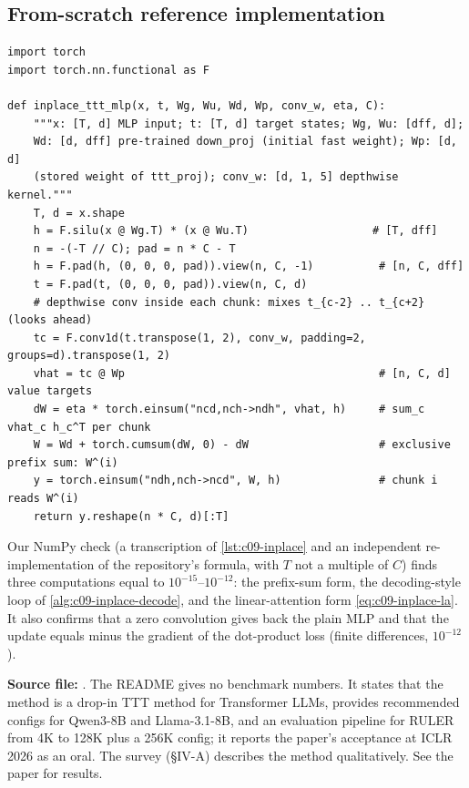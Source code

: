 \subsection{From-scratch reference implementation}

\begin{lstlisting}[caption={Reference implementation (ours): In-Place TTT MLP, parallel form.},label={lst:c09-inplace}]
import torch
import torch.nn.functional as F

def inplace_ttt_mlp(x, t, Wg, Wu, Wd, Wp, conv_w, eta, C):
    """x: [T, d] MLP input; t: [T, d] target states; Wg, Wu: [dff, d];
    Wd: [d, dff] pre-trained down_proj (initial fast weight); Wp: [d, d]
    (stored weight of ttt_proj); conv_w: [d, 1, 5] depthwise kernel."""
    T, d = x.shape
    h = F.silu(x @ Wg.T) * (x @ Wu.T)                   # [T, dff]
    n = -(-T // C); pad = n * C - T
    h = F.pad(h, (0, 0, 0, pad)).view(n, C, -1)          # [n, C, dff]
    t = F.pad(t, (0, 0, 0, pad)).view(n, C, d)
    # depthwise conv inside each chunk: mixes t_{c-2} .. t_{c+2} (looks ahead)
    tc = F.conv1d(t.transpose(1, 2), conv_w, padding=2, groups=d).transpose(1, 2)
    vhat = tc @ Wp                                       # [n, C, d] value targets
    dW = eta * torch.einsum("ncd,nch->ndh", vhat, h)     # sum_c vhat_c h_c^T per chunk
    W = Wd + torch.cumsum(dW, 0) - dW                    # exclusive prefix sum: W^(i)
    y = torch.einsum("ndh,nch->ncd", W, h)               # chunk i reads W^(i)
    return y.reshape(n * C, d)[:T]
\end{lstlisting}

Our NumPy check (a transcription of \cref{lst:c09-inplace} and an independent re-implementation
of the repository's formula, with $T$ not a multiple of $C$) finds three computations equal to
$10^{-15}$--$10^{-12}$: the prefix-sum form, the decoding-style loop of
\cref{alg:c09-inplace-decode}, and the linear-attention form \eqref{eq:c09-inplace-la}. It also
confirms that a zero convolution gives back the plain MLP and that the update equals minus the
gradient of the dot-product loss (finite differences, $10^{-12}$).

\begin{results}
\textbf{Source file:} . The README gives
no benchmark numbers. It states that the method is a drop-in TTT method for Transformer LLMs,
provides recommended configs for Qwen3-8B and Llama-3.1-8B, and an evaluation pipeline for
RULER from 4K to 128K plus a 256K config; it reports the paper's acceptance at ICLR 2026 as an
oral. The survey (\S IV-A) describes the method qualitatively. See the paper for results.
\end{results}

